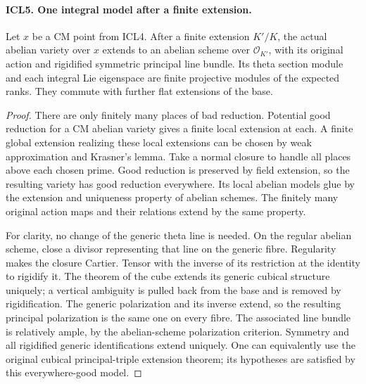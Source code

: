 \documentclass[11pt,a4paper]{article}
\numberwithin{equation}{section}
\theoremstyle{remark}\newtheorem{remark}[theorem]{Remark}
\begin{document}
\paragraph{ICL5. One integral model after a finite extension.}
\label{claim:ICL5}
Let \(x\) be a CM point from ICL4.  After a finite extension
\(K'/K\), the actual abelian variety over \(x\) extends to an
abelian scheme over \(\mathcal O_{K'}\), with its original action
and rigidified symmetric principal line bundle.  Its theta
section module and each integral Lie eigenspace are finite
projective modules of the expected ranks.  They commute with
further flat extensions of the base.
\begin{proof}
There are only finitely many places of bad reduction.  Potential
good reduction for a CM abelian variety gives a finite local
extension at each.  A finite global extension realizing these
local extensions can be chosen by weak approximation and
Krasner's lemma.  Take a normal closure to handle all places
above each chosen prime.  Good reduction is preserved by field
extension, so the resulting variety has good reduction
everywhere.  Its local abelian models glue by the extension
and uniqueness property of abelian schemes.  The finitely
many original action maps and their relations extend by the
same property.

For clarity, no change of the generic theta line is needed.
On the regular abelian scheme, close a divisor representing
that line on the generic fibre.  Regularity makes the closure
Cartier.  Tensor with the inverse of its restriction at the
identity to rigidify it.  The theorem of the cube extends its
generic cubical structure uniquely; a vertical ambiguity is
pulled back from the base and is removed by rigidification.
The generic polarization and its inverse extend, so the
resulting principal polarization is the same one on every
fibre.  The associated line bundle is relatively ample, by
the abelian-scheme polarization criterion.  Symmetry and all
rigidified generic identifications extend uniquely.  One can
equivalently use the original cubical principal-triple
extension theorem; its hypotheses are satisfied by this
everywhere-good model.


\end{proof}
\end{document}
